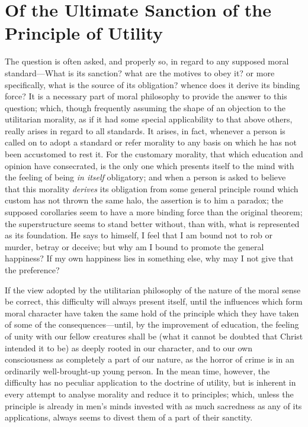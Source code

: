 \documentclass[12pt]{report}
\begin{document}
\chapter{Of the Ultimate Sanction of the Principle of Utility}
The question is often asked, and properly so, in regard to any supposed moral standard—What is its sanction? what are the motives to obey it? or more specifically, what is the source of its obligation? whence does it derive its binding force? It is a necessary part of moral philosophy to provide the answer to this question; which, though frequently assuming the shape of an objection to the utilitarian morality, as if it had some special applicability to that above others, really arises in regard to all standards. It arises, in fact, whenever a person is called on to adopt a standard or refer morality to any basis on which he has not been accustomed to rest it. For the customary morality, that which education and opinion have consecrated, is the only one which presents itself to the mind with the feeling of being \emph{in itself} obligatory; and when a person is asked to believe that this morality \emph{derives} its obligation from some general principle round which custom has not thrown the same halo, the assertion is to him a paradox; the supposed corollaries seem to have a more binding force than the original theorem; the superstructure seems to stand better without, than with, what is represented as its foundation. He says to himself, I feel that I am bound not to rob or murder, betray or deceive; but why am I bound to promote the general happiness? If my own happiness lies in something else, why may I not give that the preference?

If the view adopted by the utilitarian philosophy of the nature of the moral sense be correct, this difficulty will always present itself, until the influences which form moral character have taken the same hold of the principle which they have taken of some of the consequences—until, by the improvement of education, the feeling of unity with our fellow creatures shall be (what it cannot be doubted that Christ intended it to be) as deeply rooted in our character, and to our own consciousness as completely a part of our nature, as the horror of crime is in an ordinarily well-brought-up young person. In the mean time, however, the difficulty has no peculiar application to the doctrine of utility, but is inherent in every attempt to analyse morality and reduce it to principles; which, unless the principle is already in men's minds invested with as much sacredness as any of its applications, always seems to divest them of a part of their sanctity.
\end{document}
